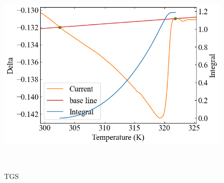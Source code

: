 \documentclass[9pt,dvipdfmx,a4paper]{jsarticle}
\begin{document}
\begin{figure}[hbt]
\begin{minipage}[t]{0.245\columnwidth}
    \end{minipage}
    \hfill
    \begin{minipage}[t]{0.245\columnwidth}
        \centering
        \includegraphics[width = \columnwidth]{appendix/TGS-dSdt-cool.png}
    \end{minipage}\\
    \caption{TGS}
\end{figure}
\end{document}
